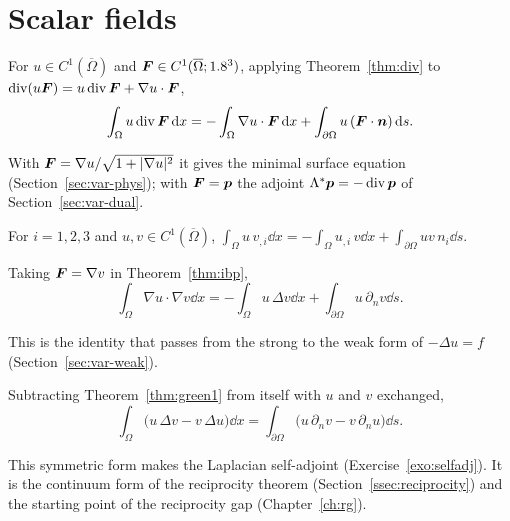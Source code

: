 \section{Scalar fields}
\begin{theorem}\label{thm:ibp}
%
For $u\in C^1(\overline\Omega)$ and $\bm{F}\in C^1(\overline\Omega;1.8^3)$,
applying Theorem~\ref{thm:div} to $\operatorname{div}(u\bm{F})=u\operatorname{div}\bm{F}+\nabla u\cdot\bm{F}$,
\[
  \int_\Omega u\operatorname{div}\bm{F}\,\mathrm{d} x=-\int_\Omega\nabla u\cdot\bm{F}\,\mathrm{d} x
  +\int_{\partial\Omega}u\,(\bm{F}\cdot\bm{n})\,\mathrm{d} s .
\]
\end{theorem}
With $\bm{F}=\nabla u/\sqrt{1+|\nabla u|^2}$ it gives the minimal surface
equation (Section~\ref{sec:var-phys}); with $\bm{F}=\bm{p}$ the adjoint
$\Lambda^\ast\bm{p}=-\operatorname{div}\bm{p}$ of Section~\ref{sec:var-dual}.

\begin{corollary}[Componentwise]\label{cor:comp}
%
For $i=1,2,3$ and $u,v\in C^1(\overline\Omega)$,
$\displaystyle\int_\Omega u\,v_{,i}\dd x=-\int_\Omega u_{,i}\,v\dd x+\int_{\partial\Omega}uv\,n_i\dd s$.
\end{corollary}

\begin{theorem}\label{thm:green1}
%
Taking $\bm{F}=\nabla v$ in Theorem~\ref{thm:ibp},
\[
  \int_\Omega\nabla u\cdot\nabla v\dd x=-\int_\Omega u\,\Delta v\dd x
  +\int_{\partial\Omega}u\,\partial_nv\dd s .
\]
\end{theorem}
This is the identity that passes from the strong to the weak form of
$-\Delta u=f$ (Section~\ref{sec:var-weak}).

\begin{theorem}\label{thm:green2}
%
Subtracting Theorem~\ref{thm:green1} from itself with $u$ and $v$ exchanged,
\[
  \int_\Omega\bigl(u\,\Delta v-v\,\Delta u\bigr)\dd x
  =\int_{\partial\Omega}\bigl(u\,\partial_nv-v\,\partial_nu\bigr)\dd s .
\]
\end{theorem}
This symmetric form makes the Laplacian self-adjoint
(Exercise~\ref{exo:selfadj}). It is the continuum form of the reciprocity
theorem (Section~\ref{ssec:reciprocity}) and the starting point of the
reciprocity gap (Chapter~\ref{ch:rg}).

